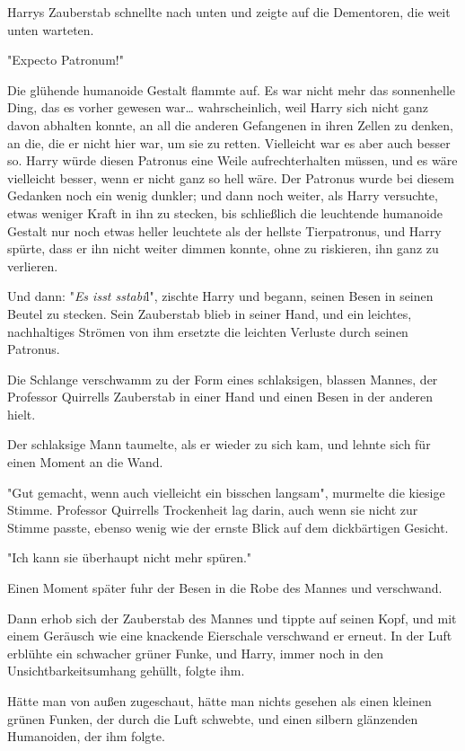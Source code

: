 {Harrys Zauberstab schnellte nach unten und zeigte auf die Dementoren, die weit unten warteten.

"Expecto Patronum!"

Die glühende humanoide Gestalt flammte auf. Es war nicht mehr das sonnenhelle Ding, das es vorher gewesen war… wahrscheinlich, weil Harry sich nicht ganz davon abhalten konnte, an all die anderen Gefangenen in ihren Zellen zu denken, an die, die er nicht hier war, um sie zu retten. Vielleicht war es aber auch besser so. Harry würde diesen Patronus eine Weile aufrechterhalten müssen, und es wäre vielleicht besser, wenn er nicht ganz so hell wäre. Der Patronus wurde bei diesem Gedanken noch ein wenig dunkler; und dann noch weiter, als Harry versuchte, etwas weniger Kraft in ihn zu stecken, bis schließlich die leuchtende humanoide Gestalt nur noch etwas heller leuchtete als der hellste Tierpatronus, und Harry spürte, dass er ihn nicht weiter dimmen konnte, ohne zu riskieren, ihn ganz zu verlieren.

Und dann: "\emph{Es isst sstabi}l", zischte Harry und begann, seinen Besen in seinen Beutel zu stecken. Sein Zauberstab blieb in seiner Hand, und ein leichtes, nachhaltiges Strömen von ihm ersetzte die leichten Verluste durch seinen Patronus.

Die Schlange verschwamm zu der Form eines schlaksigen, blassen Mannes, der Professor Quirrells Zauberstab in einer Hand und einen Besen in der anderen hielt.

Der schlaksige Mann taumelte, als er wieder zu sich kam, und lehnte sich für einen Moment an die Wand.

"Gut gemacht, wenn auch vielleicht ein bisschen langsam", murmelte die kiesige Stimme. Professor Quirrells Trockenheit lag darin, auch wenn sie nicht zur Stimme passte, ebenso wenig wie der ernste Blick auf dem dickbärtigen Gesicht.

"Ich kann sie überhaupt nicht mehr spüren."

Einen Moment später fuhr der Besen in die Robe des Mannes und verschwand.

Dann erhob sich der Zauberstab des Mannes und tippte auf seinen Kopf, und mit einem Geräusch wie eine knackende Eierschale verschwand er erneut. In der Luft erblühte ein schwacher grüner Funke, und Harry, immer noch in den Unsichtbarkeitsumhang gehüllt, folgte ihm.

Hätte man von außen zugeschaut, hätte man nichts gesehen als einen kleinen grünen Funken, der durch die Luft schwebte, und einen silbern glänzenden Humanoiden, der ihm folgte.

}
